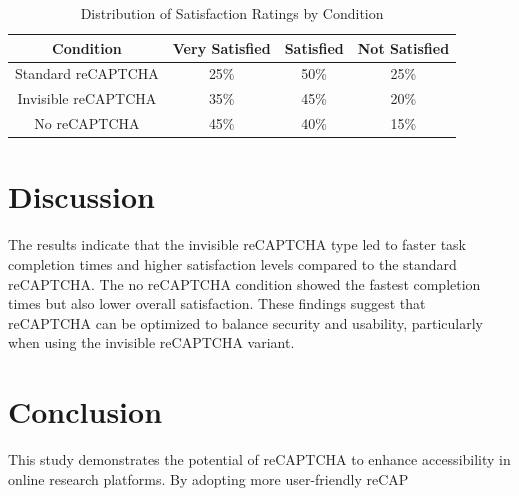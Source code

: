 \begin{table}[ht]
\centering
\begin{tabular}{|c|c|c|c|}
\hline
\textbf{Condition} & \textbf{Very Satisfied} & \textbf{Satisfied} & \textbf{Not Satisfied} \\ \hline
Standard reCAPTCHA & 25\% & 50\% & 25\% \\
Invisible reCAPTCHA & 35\% & 45\% & 20\% \\
No reCAPTCHA & 45\% & 40\% & 15\% \\ \hline
\end{tabular}
\caption{Distribution of Satisfaction Ratings by Condition}
\label{tab:satisfaction_ratings}
\end{table}

\section{Discussion}
The results indicate that the invisible reCAPTCHA type led to faster task completion times and higher satisfaction levels compared to the standard reCAPTCHA. The no reCAPTCHA condition showed the fastest completion times but also lower overall satisfaction. These findings suggest that reCAPTCHA can be optimized to balance security and usability, particularly when using the invisible reCAPTCHA variant.

\section{Conclusion}
This study demonstrates the potential of reCAPTCHA to enhance accessibility in online research platforms. By adopting more user-friendly reCAP